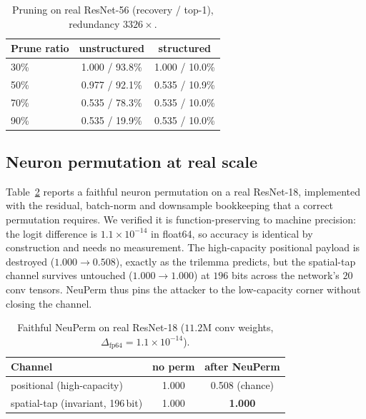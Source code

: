 \documentclass[a4paper,fleqn]{cas-dc}
\theoremstyle{plain}
\theoremstyle{remark}
\begin{document}
\begin{table}[t]\centering
\caption{Pruning on real ResNet-56 (recovery / top-1), redundancy $3326\times$.}
\label{tab:prune}
\begin{tabular*}{\columnwidth}{@{\extracolsep{\fill}}lcc@{}}
\toprule
Prune ratio & unstructured & structured\\
\midrule
30\% & 1.000 / 93.8\% & 1.000 / 10.0\%\\
50\% & 0.977 / 92.1\% & 0.535 / 10.9\%\\
70\% & 0.535 / 78.3\% & 0.535 / 10.0\%\\
90\% & 0.535 / 19.9\% & 0.535 / 10.0\%\\
\bottomrule
\end{tabular*}
\end{table}

\subsection{Neuron permutation at real scale}
Table~\ref{tab:neuperm} reports a faithful neuron permutation on a real ResNet-18,
implemented with the residual, batch-norm and downsample bookkeeping that a correct
permutation requires. We verified it is function-preserving to machine precision: the
logit difference is $1.1\times10^{-14}$ in float64, so accuracy is identical by
construction and needs no measurement. The high-capacity positional payload is
destroyed ($1.000\!\to\!0.508$), exactly as the trilemma predicts, but the spatial-tap
channel survives untouched ($1.000\!\to\!1.000$) at $196$ bits across the network's $20$
conv tensors. NeuPerm thus pins the attacker to the low-capacity corner without closing
the channel.

\begin{table}[t]\centering
\caption{Faithful NeuPerm on real ResNet-18 ($11.2$M conv weights, $\Delta_{\mathrm{fp64}}=1.1\times10^{-14}$).}
\label{tab:neuperm}
\begin{tabular*}{\columnwidth}{@{\extracolsep{\fill}}lcc@{}}
\toprule
Channel & no perm & after NeuPerm\\
\midrule
positional (high-capacity) & 1.000 & 0.508 (chance)\\
spatial-tap (invariant, 196\,bit) & 1.000 & \textbf{1.000}\\
\bottomrule
\end{tabular*}
\end{table}
\end{document}
